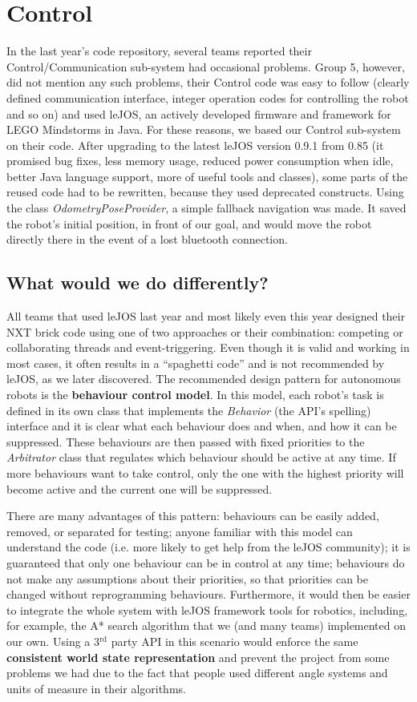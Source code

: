 \section{Control}
In the last year's code repository, several teams reported their Control/Communication sub-system had occasional problems. Group 5, however, did not mention any such problems, their Control code was easy to follow (clearly defined communication interface, integer operation codes for controlling the robot and so on) and used leJOS, an actively developed firmware and framework for LEGO Mindstorms in Java. For these reasons, we based our Control sub-system on their code. After upgrading to the latest leJOS version 0.9.1 from 0.85 (it promised bug fixes, less memory usage, reduced power consumption when idle, better Java language support, more of useful tools and classes\cite{lejos}), some parts of the reused code had to be rewritten, because they used deprecated constructs. Using the class \textit{OdometryPoseProvider}, a simple fallback navigation was made. It saved the robot's initial position, in front of our goal, and would move the robot directly there in the event of a lost bluetooth connection.

\subsection{What would we do differently?}
All teams that used leJOS last year and most likely even this year designed their NXT brick code using one of two approaches or their combination: competing or collaborating threads and event-triggering. Even though it is valid and working in most cases, it often results in a ``spaghetti code'' and is not recommended by leJOS, as we later discovered. The recommended design pattern for autonomous robots is the \textbf{behaviour control model}\cite{behaviour}. In this model, each robot's task is defined in its own class that implements the \textsl{Behavior} (the API's spelling) interface and it is clear what each behaviour does and when, and how it can be suppressed. These behaviours are then passed with fixed priorities to the \textsl{Arbitrator} class that regulates which behaviour should be active at any time. If more behaviours want to take control, only the one with the highest priority will become active and the current one will be suppressed.

There are many advantages of this pattern: behaviours can be easily added, removed, or separated for testing; anyone familiar with this model can understand the code (i.e. more likely to get help from the leJOS community); it is guaranteed that only one behaviour can be in control at any time; behaviours do not make any assumptions about their priorities, so that priorities can be changed without reprogramming behaviours. Furthermore, it would then be easier to integrate the whole system with leJOS framework tools for robotics, including, for example, the A* search algorithm that we (and many teams) implemented on our own. Using a 3$^{\textrm{rd}}$ party API in this scenario would enforce the same \textbf{consistent world state representation} and prevent the project from some problems we had due to the fact that people used different angle systems and units of measure in their algorithms.